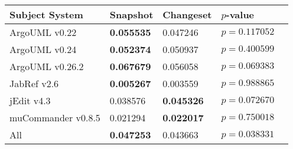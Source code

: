 \begin{table}[t]
\begin{tabular}{l|ll|ll}
\toprule
Subject System & Snapshot & Changeset & $p$-value  \\
\midrule
ArgoUML v0.22 & {\bf 0.055535 } & 0.047246 & $p = 0.117052$ \\
ArgoUML v0.24 & {\bf 0.052374 } & 0.050937 & $p = 0.400599$ \\
ArgoUML v0.26.2 & {\bf 0.067679 } & 0.056058 & $p = 0.069383$ \\
JabRef v2.6 & {\bf 0.005267 } & 0.003559 & $p = 0.988865$ \\
jEdit v4.3 & 0.038576 & {\bf 0.045326 } & $p = 0.072670$ \\
muCommander v0.8.5 & 0.021294 & {\bf 0.022017 } & $p = 0.750018$ \\
\midrule
All & {\bf 0.047253 } & 0.043663 & $p = 0.038331$ \\
\bottomrule
\end{tabular}
\label{table:rq1:method:lsi}
\end{table}
